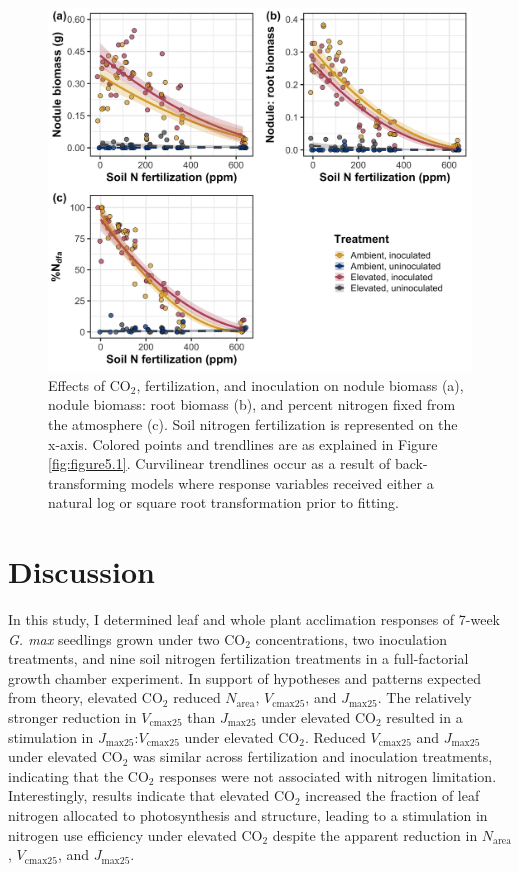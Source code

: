 \newpage
\begin{figure}
    \centering
    \includegraphics[width=\columnwidth]{ch5_NxCO2xI/figs/NxCO2xI_fig5_nFix.jpg}
    \caption[Effects of CO$_2$, fertilization, and inoculation on nodule biomass, nodule biomass: root biomass, and percent nitrogen fixed from the atmosphere]{Effects of CO$_2$, fertilization, and inoculation on nodule biomass (a), nodule biomass: root biomass (b), and percent nitrogen fixed from the atmosphere (c). Soil nitrogen fertilization is represented on the x-axis. Colored points and trendlines are as explained in Figure \ref{fig:figure5.1}. Curvilinear trendlines occur as a result of back-transforming models where response variables received either a natural log or square root transformation prior to fitting.}
    \label{fig:figure5.5}
\end{figure}
\clearpage

\section{Discussion}
\noindent In this study, I determined leaf and whole plant acclimation responses of 7-week \textit{G. max} seedlings grown under two CO$_2$ concentrations, two inoculation treatments, and nine soil nitrogen fertilization treatments in a full-factorial growth chamber experiment. In support of hypotheses and patterns expected from theory, elevated CO$_2$ reduced $N_\mathrm{area}$, $V_\mathrm{cmax25}$, and $J_\mathrm{max25}$. The relatively stronger reduction in $V_\mathrm{cmax25}$ than $J_\mathrm{max25}$ under elevated CO$_2$ resulted in a stimulation in $J_\mathrm{max25}$:$V_\mathrm{cmax25}$ under elevated CO$_2$. Reduced $V_\mathrm{cmax25}$ and $J_\mathrm{max25}$ under elevated CO$_2$ was similar across fertilization and inoculation treatments, indicating that the CO$_2$ responses were not associated with nitrogen limitation. Interestingly, results indicate that elevated CO$_2$ increased the fraction of leaf nitrogen allocated to photosynthesis and structure, leading to a stimulation in nitrogen use efficiency under elevated CO$_2$ despite the apparent reduction in $N_\mathrm{area}$, $V_\mathrm{cmax25}$, and $J_\mathrm{max25}$.


